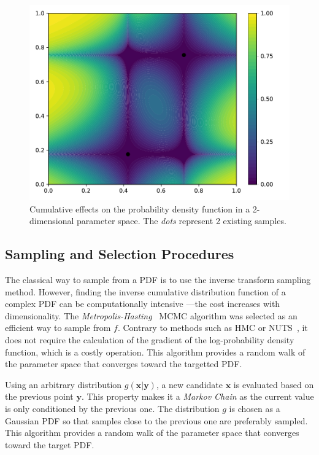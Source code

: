 \begin{figure}[!ht]
\centering
\includegraphics[width=0.8\linewidth,keepaspectratio]{fig/contributions/doe/kde_inter.pdf}
\caption{Cumulative effects on the probability density function in a 2-dimensional parameter space. The \emph{dots} represent 2 existing samples.}
\label{fig:inter_kde}
\end{figure}


\subsection{Sampling and Selection Procedures}\label{sec:sample}


The classical way to sample from a PDF is to use the inverse transform sampling method. However, finding the inverse cumulative distribution function of a complex PDF can be computationally intensive ---\thinspace the cost increases with dimensionality. The \emph{Metropolis-Hasting}~\citep{Hastings1979} MCMC algorithm was selected as an efficient way to sample from $f$. Contrary to methods such as HMC or NUTS~\citep{Hoffman2011}, it does not require the calculation of the gradient of the log-probability density function, which is a costly operation. This algorithm provides a random walk of the parameter space that converges toward the targetted PDF.

Using an arbitrary distribution $g(\mathbf{x}|\mathbf{y})$, a new candidate $\mathbf{x}$ is evaluated based on the previous point $\mathbf{y}$. This property makes it a \emph{Markov Chain} as the current value is only conditioned by the previous one. The distribution $g$ is chosen as a Gaussian PDF so that samples close to the previous one are preferably sampled. This algorithm provides a random walk of the parameter space that converges toward the target PDF.

